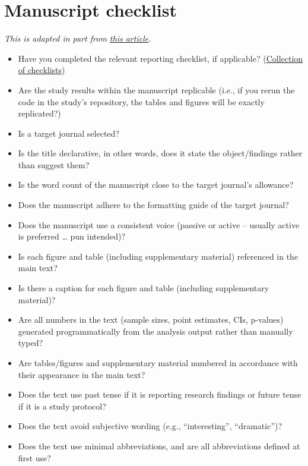 \documentclass[
]{book}
\providecommand{\tightlist}{%
  \setlength{\itemsep}{0pt}\setlength{\parskip}{0pt}}
\begin{document}
\section{Manuscript checklist}\label{manuscript-checklist}

\emph{This is adapted in part from \href{https://www.nature.com/articles/d41586-019-01431-z}{this article}.}

\begin{itemize}
\tightlist
\item
  Have you completed the relevant reporting checklist, if applicable? (\href{https://www.equator-network.org/about-us/what-is-a-reporting-guideline/}{Collection of checklists})
\item
  Are the study results within the manuscript replicable (i.e., if you rerun the code in the study's repository, the tables and figures will be exactly replicated?)
\item
  Is a target journal selected?
\item
  Is the title declarative, in other words, does it state the object/findings rather than suggest them?
\item
  Is the word count of the manuscript close to the target journal's allowance?
\item
  Does the manuscript adhere to the formatting guide of the target journal?
\item
  Does the manuscript use a consistent voice (passive or active -- usually active is preferred \ldots{} pun intended)?
\item
  Is each figure and table (including supplementary material) referenced in the main text?
\item
  Is there a caption for each figure and table (including supplementary material)?\\
\item
  Are all numbers in the text (sample sizes, point estimates, CIs, p-values) generated programmatically from the analysis output rather than manually typed?\\
\item
  Are tables/figures and supplementary material numbered in accordance with their appearance in the main text?
\item
  Does the text use past tense if it is reporting research findings or future tense if it is a study protocol?
\item
  Does the text avoid subjective wording (e.g., ``interesting'', ``dramatic'')?
\item
  Does the text use minimal abbreviations, and are all abbreviations defined at first use?

\end{itemize}
\end{document}
